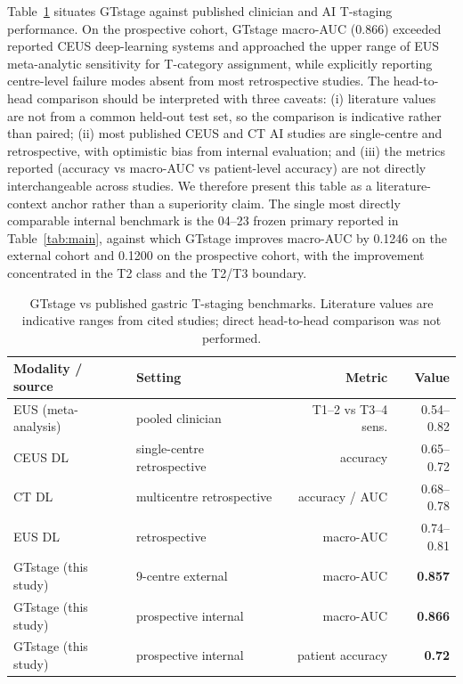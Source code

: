 \documentclass[11pt,a4paper]{article}
\begin{document}
Table~\ref{tab:benchmark} situates GTstage against published clinician and AI T-staging performance. On the prospective cohort, GTstage macro-AUC (0.866) exceeded reported CEUS deep-learning systems and approached the upper range of EUS meta-analytic sensitivity for T-category assignment, while explicitly reporting centre-level failure modes absent from most retrospective studies. The head-to-head comparison should be interpreted with three caveats: (i) literature values are not from a common held-out test set, so the comparison is indicative rather than paired; (ii) most published CEUS and CT AI studies are single-centre and retrospective, with optimistic bias from internal evaluation; and (iii) the metrics reported (accuracy vs macro-AUC vs patient-level accuracy) are not directly interchangeable across studies. We therefore present this table as a literature-context anchor rather than a superiority claim. The single most directly comparable internal benchmark is the 04--23 frozen primary reported in Table~\ref{tab:main}, against which GTstage improves macro-AUC by 0.1246 on the external cohort and 0.1200 on the prospective cohort, with the improvement concentrated in the T2 class and the T2/T3 boundary.

\begin{table}[t]
\caption{GTstage vs published gastric T-staging benchmarks. Literature values are indicative ranges from cited studies; direct head-to-head comparison was not performed.}
\label{tab:benchmark}
\centering
\small
\begin{tabular}{llrr}
\toprule
\textbf{Modality / source} & \textbf{Setting} & \textbf{Metric} & \textbf{Value} \\
\midrule
EUS (meta-analysis) \cite{mocellin2011eus} & pooled clinician & T1--2 vs T3--4 sens. & 0.54--0.82 \\
CEUS DL \cite{zheng2025interpretable} & single-centre retrospective & accuracy & 0.65--0.72 \\
CT DL \cite{tao2024ct, liang2023ct} & multicentre retrospective & accuracy / AUC & 0.68--0.78 \\
EUS DL \cite{gTRNet2023} & retrospective & macro-AUC & 0.74--0.81 \\
\midrule
GTstage (this study) & 9-centre external & macro-AUC & \textbf{0.857} \\
GTstage (this study) & prospective internal & macro-AUC & \textbf{0.866} \\
GTstage (this study) & prospective internal & patient accuracy & \textbf{0.72} \\
\bottomrule
\end{tabular}
\end{table}
\end{document}
